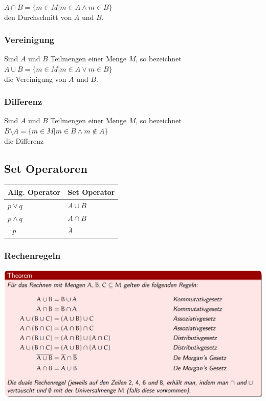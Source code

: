\documentclass[12pt]{scrartcl}
\begin{document}
$A \cap B = \{m \in M | m \in A \land m \in B\}$\\

den  Durchschnitt von $A$ und $B$.


\subsubsection{Vereinigung}
Sind $A$ und $B$ Teilmengen einer Menge $M$, so bezeichnet\\

$A \cup B = \{m \in M | m \in A \lor m \in B\}$\\

die Vereinigung von $A$ und $B$.


\newpage
\subsubsection{Differenz}
Sind $A$ und $B$ Teilmengen einer Menge $M$, so bezeichnet \\

$B \setminus A = \{m \in M | m \in B \land m \notin A\}$\\

die Differenz


\subsection{Set Operatoren}
\renewcommand{\arraystretch}{1.5}
\begin{tabular}{ | m{7em} | m{7em} | }
    \hline
    Allg. Operator & Set Operator \\ 
    \hline
    $p \lor q$ & $A \cup B$ \\ 
    \hline
    $p \land q$ & $A \cap B$ \\ 
    \hline
    $\lnot p$ & $\overline{A} $ \\ 
    \hline
\end{tabular}

\subsubsection{Rechenregeln}
\includegraphics[width=15cm]{img/Rechenregeln_mit_mengen.png}
\end{document}
